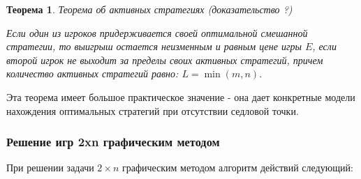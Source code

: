 \documentclass[aps,%
12pt,%
final,%
oneside,
onecolumn,%
musixtex, %
superscriptaddress,%
centertags]{article} %
\theoremstyle{plain}
\newtheorem{theorem}{Теорема}[section] %
\theoremstyle{definition}
\theoremstyle{remark}
\begin{document}
\begin{theorem}
  Теорема об активных стратегиях (доказательство ?)

  Если один из игроков придерживается своей оптимальной смешанной стратегии, то выигрыш остается неизменным и равным цене игры $E$, если второй игрок не выходит за пределы своих активных стратегий, причем количество активных стратегий равно: $L = \min(m,n)$.
\end{theorem}

Эта теорема имеет большое практическое значение - она дает конкретные модели нахождения оптимальных стратегий при отсутствии седловой точки.

\subsubsection{Решение игр 2xn графическим методом}

При решении задачи $2 \times n$ графическим методом алгоритм действий следующий:
\end{document}
